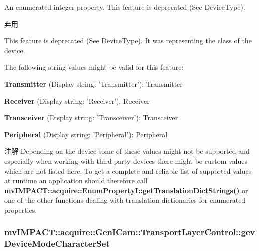 An enumerated integer property. This feature is deprecated (See Device\+Type). 

\begin{DoxyRefDesc}{弃用}
\item[\hyperlink{deprecated__deprecated000060}{弃用}]This feature is deprecated (See Device\+Type). It was representing the class of the device.\end{DoxyRefDesc}


The following string values might be valid for this feature\+:
\begin{DoxyItemize}
\item {\bfseries Transmitter} (Display string\+: 'Transmitter')\+: Transmitter
\item {\bfseries Receiver} (Display string\+: 'Receiver')\+: Receiver
\item {\bfseries Transceiver} (Display string\+: 'Transceiver')\+: Transceiver
\item {\bfseries Peripheral} (Display string\+: 'Peripheral')\+: Peripheral
\end{DoxyItemize}

\begin{DoxyNote}{注解}
Depending on the device some of these values might not be supported and especially when working with third party devices there might be custom values which are not listed here. To get a complete and reliable list of supported values at runtime an application should therefore call {\bfseries \hyperlink{classmv_i_m_p_a_c_t_1_1acquire_1_1_enum_property_i_a0ba6ccbf5ee69784d5d0b537924d26b6}{mv\+I\+M\+P\+A\+C\+T\+::acquire\+::\+Enum\+Property\+I\+::get\+Translation\+Dict\+Strings()}} or one of the other functions dealing with translation dictionaries for enumerated properties. 
\end{DoxyNote}
\hypertarget{classmv_i_m_p_a_c_t_1_1acquire_1_1_gen_i_cam_1_1_transport_layer_control_a78dd1674e999f062707bf819a570168a}{
\subsubsection[{gev\+Device\+Mode\+Character\+Set}]{ mv\+I\+M\+P\+A\+C\+T\+::acquire\+::\+Gen\+I\+Cam\+::\+Transport\+Layer\+Control\+::gev\+Device\+Mode\+Character\+Set}}\label{classmv_i_m_p_a_c_t_1_1acquire_1_1_gen_i_cam_1_1_transport_layer_control_a78dd1674e999f062707bf819a570168a}


